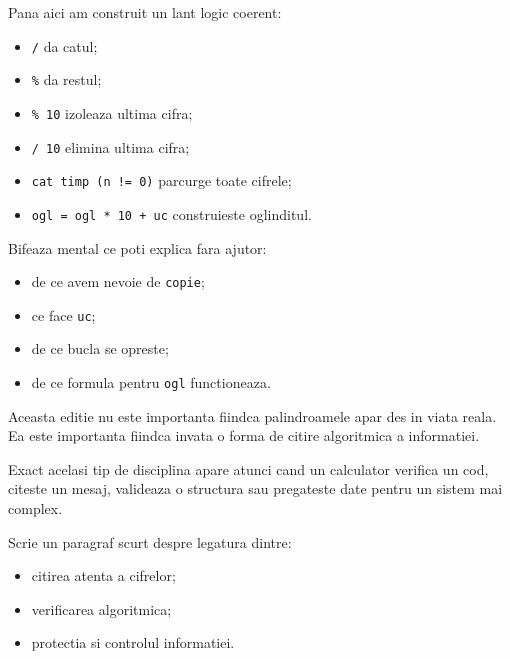 
\begin{checkpointbox}
  Pana aici am construit un lant logic coerent:
  \begin{itemize}
    \item \texttt{/} da catul;
    \item \texttt{\%} da restul;
    \item \texttt{\% 10} izoleaza ultima cifra;
    \item \texttt{/ 10} elimina ultima cifra;
    \item \texttt{cat timp (n != 0)} parcurge toate cifrele;
    \item \texttt{ogl = ogl * 10 + uc} construieste oglinditul.
  \end{itemize}
\end{checkpointbox}

\begin{guidebox}[Autoevaluare]
  Bifeaza mental ce poti explica fara ajutor:
  \begin{itemize}
    \item de ce avem nevoie de \texttt{copie};
    \item ce face \texttt{uc};
    \item de ce bucla se opreste;
    \item de ce formula pentru \texttt{ogl} functioneaza.
  \end{itemize}
\end{guidebox}

\newpage
{}

\begin{missionbox}
  Aceasta editie nu este importanta fiindca palindroamele apar des in viata reala. Ea este importanta fiindca invata o forma de citire algoritmica a informatiei.

  Exact acelasi tip de disciplina apare atunci cand un calculator verifica un cod, citeste un mesaj, valideaza o structura sau pregateste date pentru un sistem mai complex.
\end{missionbox}

\begin{solobox}[Reflectie]
  Scrie un paragraf scurt despre legatura dintre:
  \begin{itemize}
    \item citirea atenta a cifrelor;
    \item verificarea algoritmica;
    \item protectia si controlul informatiei.
  \end{itemize}
\end{solobox}
